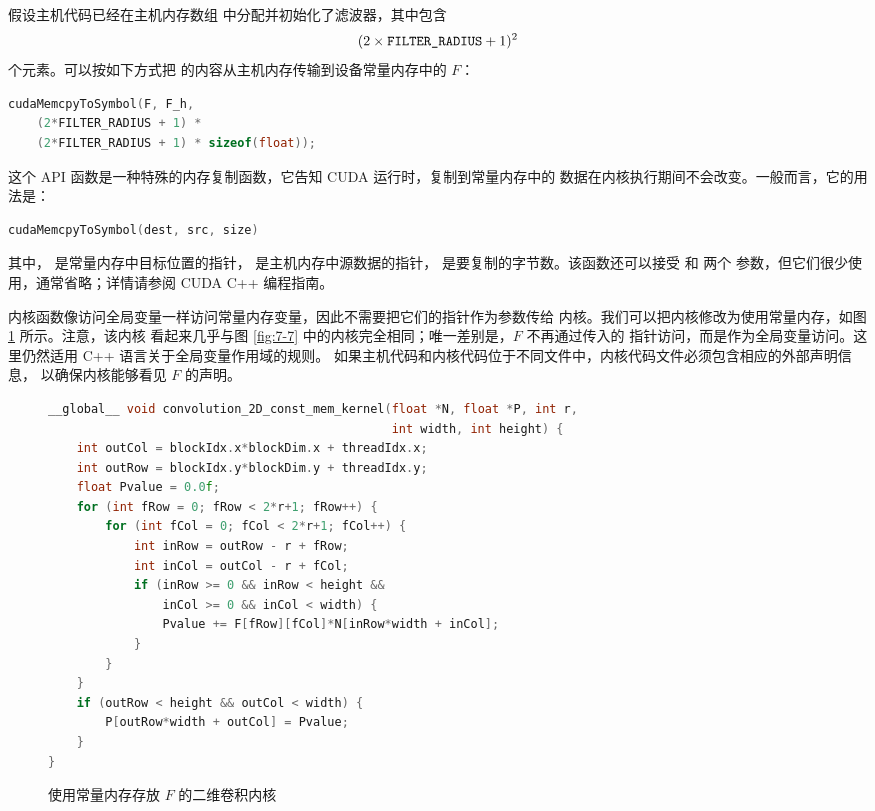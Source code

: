 假设主机代码已经在主机内存数组  中分配并初始化了滤波器，其中包含
\[
  (2\times\code{FILTER_RADIUS}+1)^2
\]
个元素。可以按如下方式把  的内容从主机内存传输到设备常量内存中的 $F$：

\begin{lstlisting}[language=C++]
cudaMemcpyToSymbol(F, F_h,
    (2*FILTER_RADIUS + 1) *
    (2*FILTER_RADIUS + 1) * sizeof(float));
\end{lstlisting}

这个 API 函数是一种特殊的内存复制函数，它告知 CUDA 运行时，复制到常量内存中的
数据在内核执行期间不会改变。一般而言，它的用法是：

\begin{lstlisting}[language=C++]
cudaMemcpyToSymbol(dest, src, size)
\end{lstlisting}

其中， 是常量内存中目标位置的指针， 是主机内存中源数据的指针，
 是要复制的字节数。该函数还可以接受  和  两个
参数，但它们很少使用，通常省略；详情请参阅 CUDA C++ 编程指南。

内核函数像访问全局变量一样访问常量内存变量，因此不需要把它们的指针作为参数传给
内核。我们可以把内核修改为使用常量内存，如图 \ref{fig:7-9} 所示。注意，该内核
看起来几乎与图 \ref{fig:7-7} 中的内核完全相同；唯一差别是，$F$ 不再通过传入的
指针访问，而是作为全局变量访问。这里仍然适用 C++ 语言关于全局变量作用域的规则。
如果主机代码和内核代码位于不同文件中，内核代码文件必须包含相应的外部声明信息，
以确保内核能够看见 $F$ 的声明。

\begin{figure}[htbp]
  \centering
  \begin{lstlisting}[language=C++,basicstyle=\ttfamily\scriptsize]
__global__ void convolution_2D_const_mem_kernel(float *N, float *P, int r,
                                                int width, int height) {
    int outCol = blockIdx.x*blockDim.x + threadIdx.x;
    int outRow = blockIdx.y*blockDim.y + threadIdx.y;
    float Pvalue = 0.0f;
    for (int fRow = 0; fRow < 2*r+1; fRow++) {
        for (int fCol = 0; fCol < 2*r+1; fCol++) {
            int inRow = outRow - r + fRow;
            int inCol = outCol - r + fCol;
            if (inRow >= 0 && inRow < height &&
                inCol >= 0 && inCol < width) {
                Pvalue += F[fRow][fCol]*N[inRow*width + inCol];
            }
        }
    }
    if (outRow < height && outCol < width) {
        P[outRow*width + outCol] = Pvalue;
    }
}
  \end{lstlisting}
  \caption{使用常量内存存放 $F$ 的二维卷积内核}
  \label{fig:7-9}
\end{figure}

